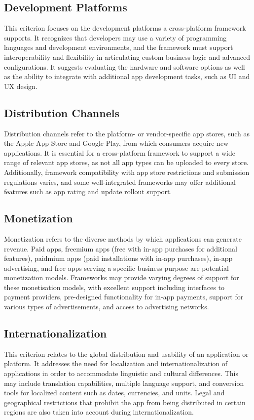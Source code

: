 \subsection{Development Platforms} 
This criterion focuses on the development platforms a cross-platform framework supports. It recognizes that developers may use a variety of programming languages and development environments, and the framework must support interoperability and flexibility in articulating custom business logic and advanced configurations. It suggests evaluating the hardware and software options as well as the ability to integrate with additional app development tasks, such as UI and UX design.

\subsection{Distribution Channels} 
Distribution channels refer to the platform- or vendor-specific app stores, such as the Apple App Store and Google Play, from which consumers acquire new applications. It is essential for a cross-platform framework to support a wide range of relevant app stores, as not all app types can be uploaded to every store. Additionally, framework compatibility with app store restrictions and submission regulations varies, and some well-integrated frameworks may offer additional features such as app rating and update rollout support.

\subsection{Monetization}
Monetization refers to the diverse methods by which applications can generate revenue. Paid apps, freemium apps (free with in-app purchases for additional features), paidmium apps (paid installations with in-app purchases), in-app advertising, and free apps serving a specific business purpose are potential monetization models. Frameworks may provide varying degrees of support for these monetisation models, with excellent support including interfaces to payment providers, pre-designed functionality for in-app payments, support for various types of advertisements, and access to advertising networks.

\subsection{Internationalization}
This criterion relates to the global distribution and usability of an application or platform. It addresses the need for localization and internationalization of applications in order to accommodate linguistic and cultural differences. This may include translation capabilities, multiple language support, and conversion tools for localized content such as dates, currencies, and units. Legal and geographical restrictions that prohibit the app from being distributed in certain regions are also taken into account during internationalization.

